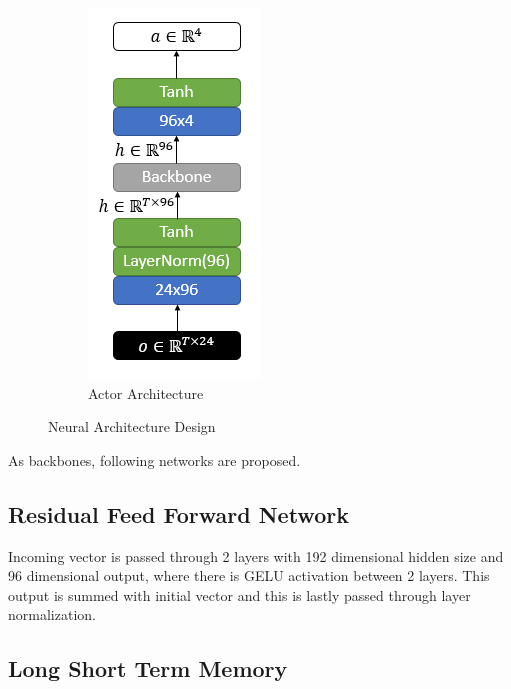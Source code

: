 \begin{figure}
\begin{subfigure}{.5\textwidth}
		\includegraphics[width=0.55\linewidth]{figures/nets/actor.png}
		\caption{Actor Architecture}
		\label{fig:actor_net}
	\end{subfigure}
	\caption{Neural Architecture Design}
	\label{fig:nets}
\end{figure}

As backbones, following networks are proposed. 

\subsection{Residual Feed Forward Network}

Incoming vector is passed through 2 layers with 192 dimensional hidden size and 96 dimensional output, where there is GELU activation between 2 layers. 
This output is summed with initial vector and this is lastly passed through layer normalization. 

\subsection{Long Short Term Memory}

